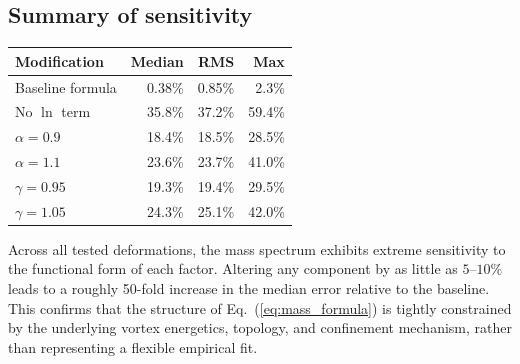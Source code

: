 \documentclass[11pt,a4paper]{article}
\begin{document}
\subsection{Summary of sensitivity}

\begin{center}
\begin{tabular}{lrrr}
\toprule
Modification & Median & RMS & Max \\
\midrule
Baseline formula           & 0.38\% & 0.85\% &  2.3\% \\
No $\ln$ term              & 35.8\% & 37.2\% & 59.4\% \\
$\alpha = 0.9$             & 18.4\% & 18.5\% & 28.5\% \\
$\alpha = 1.1$             & 23.6\% & 23.7\% & 41.0\% \\
$\gamma = 0.95$            & 19.3\% & 19.4\% & 29.5\% \\
$\gamma = 1.05$            & 24.3\% & 25.1\% & 42.0\% \\
\bottomrule
\end{tabular}
\end{center}

Across all tested deformations, the mass spectrum exhibits extreme
sensitivity to the functional form of each factor.  Altering any
component by as little as $5$--$10\%$ leads to a roughly 50-fold
increase in the median error relative to the baseline.  This
confirms that the structure of Eq.~(\ref{eq:mass_formula}) is
tightly constrained by the underlying vortex energetics, topology,
and confinement mechanism, rather than representing a flexible
empirical fit.
\end{document}
